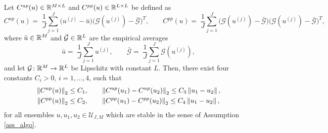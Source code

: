 \documentclass[10pt]{article}
\begin{document}
\begin{lemma} \label{covariance_bound} Let $C^{up}(u) \in \mathbb{R}^{M\times L}$ and $C^{pp}(u) \in \mathbb{R}^{L \times L}$ be defined as
\begin{equation*}
	C^{up}(u) = \; \frac{1}{J} \sum_{j=1}^J \big(u^{(j)} - \bar{u}\big) \big(\mathcal{G}(u^{(j)}) - \bar{\mathcal{G}}\big)^T,  \qquad C^{pp}(u) = \; \frac{1}{J} \sum_{j=1}^J \big(\mathcal{G}(u^{(j)}) - \bar{\mathcal{G}}\big) \big(\mathcal{G}(u^{(j)}) - \bar{\mathcal{G}}\big)^T,
\end{equation*}
where $\bar u \in \mathbb{R}^M $ and $\bar{\mathcal G} \in \mathbb{R}^L$ are the empirical averages
\begin{equation*}
	\bar{u} = \; \frac{1}{J} \sum_{j=1}^J u^{(j)}, \qquad \bar{\mathcal{G}} = \; \frac{1}{J} \sum_{j=1}^J \mathcal{G}(u^{(j)}),
\end{equation*}
and let $\mathcal G \colon \mathbb{R}^M \to \mathbb{R}^L$ be Lipschitz with constant $L$. Then, there exist four constants $C_i > 0$, $i = 1, \ldots, 4$, such that
\begin{align*}
\left\|C^{up}(u)\right\|_2 &\le C_1, \qquad  \left\|C^{up}(u_1) - C^{up}(u_2)\right\|_2 \le C_3 \left\|u_1 - u_2\right\|,\\
\left\|C^{pp}(u)\right\|_2 &\le C_2, \qquad  \left\|C^{pp}(u_1) - C^{pp}(u_2)\right\|_2 \le C_4 \left\|u_1 - u_2\right\|,
\end{align*}
for all ensembles $u, u_1, u_2 \in \mathcal U_{J,M}$ which are stable in the sense of Assumption \ref{ass_algo}.
\end{lemma}
\end{document}
